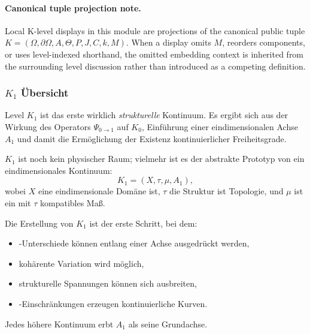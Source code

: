 



\paragraph{Canonical tuple projection note.}
Local K-level displays in this module are projections of the canonical public tuple \(K=(\Omega,\partial\Omega,A,\Theta,P,J,C,k,M)\). When a display omits \(M\), reorders components, or uses level-indexed shorthand, the omitted embedding context is inherited from the surrounding level discussion rather than introduced as a competing definition.

\subsubsection{\texorpdfstring{$K_1$}{K_1} Übersicht}
\label{sec:k1-overview}

Level $K_1$ ist das erste wirklich \emph{strukturelle} Kontinuum.
Es ergibt sich aus der Wirkung des Operators $\Psi_{0\to1}$ auf $K_0$,
Einführung einer eindimensionalen Achse $A_1$ und damit die Ermöglichung der Existenz
kontinuierlicher Freiheitsgrade.

$K_1$ ist noch kein physischer Raum; vielmehr ist es der abstrakte Prototyp von
ein eindimensionales Kontinuum:
\[
K_1 = (X, \tau, \mu, A_1),
\]
wobei $X$ eine eindimensionale Domäne ist, $\tau$ die Struktur ist
Topologie, und $\mu$ ist ein mit $\tau$ kompatibles Maß.

Die Erstellung von $K_1$ ist der erste Schritt, bei dem:
\begin{itemize}
    \item-Unterschiede können entlang einer Achse ausgedrückt werden,
    \item kohärente Variation wird möglich,
    \item strukturelle Spannungen können sich ausbreiten,
    \item-Einschränkungen erzeugen kontinuierliche Kurven.
\end{itemize}

Jedes höhere Kontinuum erbt $A_1$ als seine Grundachse.

